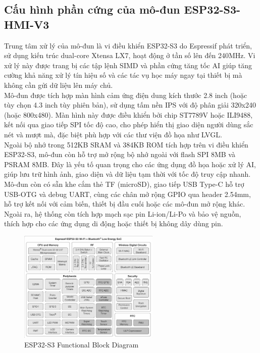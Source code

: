 \subsection{Cấu hình phần cứng của mô-đun ESP32-S3-HMI-V3} 
\tab Trung tâm xử lý của mô-đun là vi điều khiển ESP32-S3 do Espressif phát triển, sử dụng kiến trúc dual-core Xtensa LX7, hoạt động ở tần số lên đến 240MHz. Vi xử lý này được trang bị các tập lệnh SIMD và phần cứng tăng tốc AI giúp tăng cường khả năng xử lý tín hiệu số và các tác vụ học máy ngay tại thiết bị mà không cần gửi dữ liệu lên máy chủ.\\
\tab Mô-đun được tích hợp màn hình cảm ứng điện dung kích thước 2.8 inch (hoặc tùy chọn 4.3 inch tùy phiên bản), sử dụng tấm nền IPS với độ phân giải 320x240 (hoặc 800x480). Màn hình này được điều khiển bởi chip ST7789V hoặc ILI9488, kết nối qua giao tiếp SPI tốc độ cao, cho phép hiển thị giao diện người dùng sắc nét và mượt mà, đặc biệt phù hợp với các thư viện đồ họa như LVGL.\\
\tab Ngoài bộ nhớ trong 512KB SRAM và 384KB ROM tích hợp trên vi điều khiển ESP32-S3, mô-đun còn hỗ trợ mở rộng bộ nhớ ngoài với flash SPI 8MB và PSRAM 8MB. Đây là yếu tố quan trọng cho các ứng dụng đồ họa hoặc xử lý AI, giúp lưu trữ hình ảnh, giao diện và dữ liệu tạm thời với tốc độ truy cập nhanh.\\
\tab Mô-đun còn có sẵn khe cắm thẻ TF (microSD), giao tiếp USB Type-C hỗ trợ USB-OTG và debug UART, cùng các chân mở rộng GPIO qua header 2.54mm, hỗ trợ kết nối với cảm biến, thiết bị đầu cuối hoặc các mô-đun mở rộng khác. Ngoài ra, hệ thống còn tích hợp mạch sạc pin Li-ion/Li-Po và bảo vệ nguồn, thích hợp cho các ứng dụng di động hoặc thiết bị không dây dùng pin.
\begin{figure}[H]
  \centering
  \includegraphics[width=0.6\textwidth]{Images/ESP32-S3-Funtion-diagram.png} 
  \caption{ESP32-S3 Functional Block Diagram}
\end{figure}
